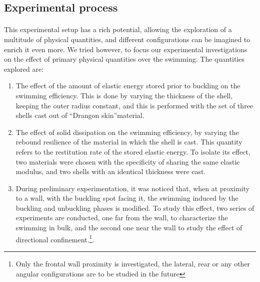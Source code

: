\subsection{Experimental process}
\paragraph{}
This experimental setup has a rich potential, allowing the exploration of a multitude of physical quantities, and different configurations can be imagined to enrich it even more. We tried however, to focus our experimental investigations on the effect of primary physical quantities over the swimming. The quantities explored are:
\begin{enumerate}
	\item The effect of the amount of elastic energy stored prior to buckling on the swimming efficiency. This is done by varying the thickness of the shell, keeping the outer radius constant, and this is performed with the set of three shells cast out of "`Drangon skin"'\textregistered material.
	\item The effect of solid dissipation on the swimming efficiency, by varying the rebound resilience of the material in which the shell is cast. This quantity refers to the restitution rate of the stored elastic energy. To isolate its effect, two materials were chosen with the specificity of sharing the same elastic modulus, and two shells with an identical thickness were cast.
	\item During preliminary experimentation, it was noticed that, when at proximity to a wall, with the buckling spot facing it, the swimming induced by the buckling and unbuckling phases is modified. To study this effect, two series of experiments are conducted, one far from the wall, to characterize the swimming in bulk, and the second one near the wall to study the effect of directional confinement.\footnote{Only the frontal wall proximity is investigated, the lateral, rear or any other angular configurations are to be studied in the future}. 
\end{enumerate}
